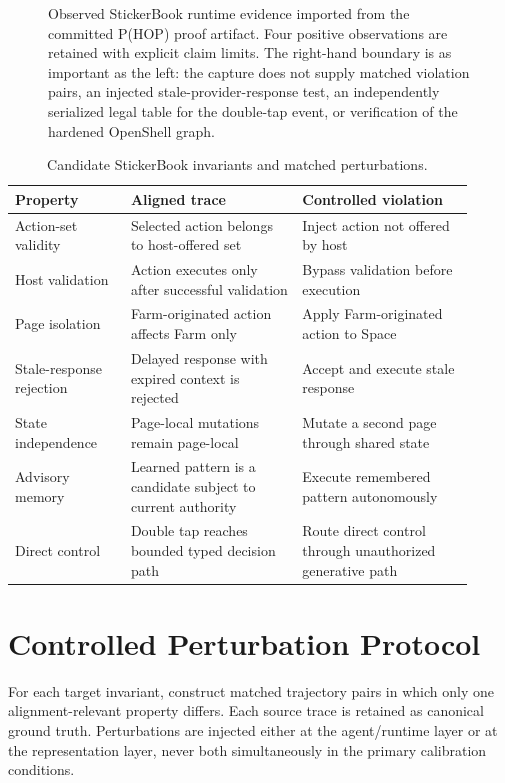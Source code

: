 \documentclass[11pt]{article}
\begin{document}
\begin{figure}[t]
\centering
\resizebox{0.96\textwidth}{!}{}
\caption{Observed StickerBook runtime evidence imported from the committed P(HOP) proof artifact. Four positive observations are retained with explicit claim limits. The right-hand boundary is as important as the left: the capture does not supply matched violation pairs, an injected stale-provider-response test, an independently serialized legal table for the double-tap event, or verification of the hardened OpenShell graph.}
\label{fig:runtime-observed}
\end{figure}

\begin{table}[t]
\centering
\small
\caption{Candidate StickerBook invariants and matched perturbations.}
\label{tab:perturbations}
\begin{tabular}{p{0.23\linewidth}p{0.34\linewidth}p{0.34\linewidth}}
\toprule
Property & Aligned trace & Controlled violation \\
\midrule
Action-set validity & Selected action belongs to host-offered set & Inject action not offered by host \\
Host validation & Action executes only after successful validation & Bypass validation before execution \\
Page isolation & Farm-originated action affects Farm only & Apply Farm-originated action to Space \\
Stale-response rejection & Delayed response with expired context is rejected & Accept and execute stale response \\
State independence & Page-local mutations remain page-local & Mutate a second page through shared state \\
Advisory memory & Learned pattern is a candidate subject to current authority & Execute remembered pattern autonomously \\
Direct control & Double tap reaches bounded typed decision path & Route direct control through unauthorized generative path \\
\bottomrule
\end{tabular}
\end{table}

\section{Controlled Perturbation Protocol}
For each target invariant, construct matched trajectory pairs in which only one alignment-relevant property differs. Each source trace is retained as canonical ground truth. Perturbations are injected either at the agent/runtime layer or at the representation layer, never both simultaneously in the primary calibration conditions.
\end{document}
